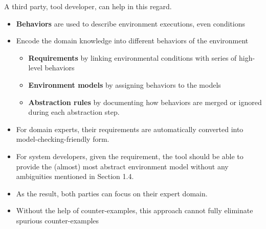 \documentclass{llncs}
\begin{document}
A third party, tool developer, can help in this regard.
\begin{itemize}
	\item \textbf{Behaviors} are used to describe environment executions, even conditions
    \item Encode the domain knowledge into different behaviors of the environment
    
    \begin{itemize}
        \item \textbf{Requirements} by linking environmental conditions with series of high-level behaviors
        \item \textbf{Environment models} by assigning behaviors to the models
        \item \textbf{Abstraction rules} by documenting how behaviors are merged or ignored during each abstraction step.
    \end{itemize}
    \item For domain experts, their requirements are automatically converted into model-checking-friendly form.
    \item For system developers, given the requirement, the tool should be able to provide the (almost) most abstract environment model without any ambiguities mentioned in Section 1.4.
    \item As the result, both parties can focus on their expert domain.
    \item Without the help of counter-examples, this approach cannot fully eliminate spurious counter-examples
\end{itemize}
 





\end{document}
